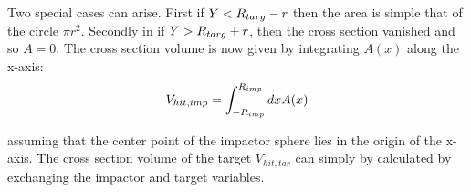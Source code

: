 Two special cases can arise. First if $Y < R_{targ} - r $ then the area is simple that of the circle $\pi r^2$. Secondly in if $Y > R_{targ} + r$, then the cross section vanished and so $A = 0$. The cross section volume is now given by integrating $A(x)$ along the x-axis:
\begin{align}
\label{ch07_sec01_eq002}
V_{hit, imp} = \int_{-R_{imp}}^{R_{imp}} dx A(x)
\end{align}

assuming that the center point of the impactor sphere lies in the origin of the x-axis. The cross section volume of the target $V_{hit, tar}$ can simply by calculated by exchanging the impactor and target variables. 

